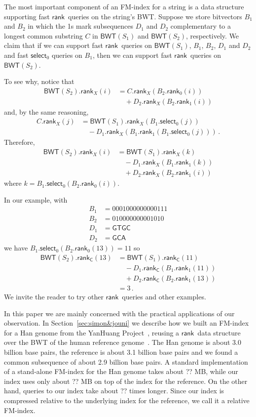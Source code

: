 \documentclass{llncs}
\newcommand{\BWT}
  {\ensuremath{\mathsf{BWT}}}
\newcommand{\rank}
  {\ensuremath{\mathsf{rank}}}
\newcommand{\select}
  {\ensuremath{\mathsf{select}}}
\begin{document}
The most important component of an FM-index for a string is a data structure supporting fast \rank\ queries on the string's BWT.  Suppose we store bitvectors $B_1$ and $B_2$ in which the 1s mark subsequences $D_1$ and $D_2$ complementary to a longest common substring $C$ in \(\BWT (S_1)\) and \(\BWT (S_2)\), respectively.  We claim that if we can support fast \rank\ queries on \(\BWT (S_1)\), $B_1$, $B_2$, $D_1$ and $D_2$ and fast $\select_0$ queries on $B_1$, then we can support fast \rank\ queries on \(\BWT (S_2)\).

To see why, notice that
\begin{align*}
\BWT (S_2).\rank_X (i)
& = C.\rank_X (B_2.\rank_0 (i))\\
& \quad + D_2.\rank_X (B_2.\rank_1 (i))
\end{align*}
and, by the same reasoning, 
\begin{align*}
C.\rank_X (j)
& = \BWT (S_1).\rank_X (B_1.\select_0 (j))\\
& \quad - D_1.\rank_X (B_1.\rank_1 (B_1.\select_0 (j)))\,.
\end{align*}
Therefore,
\begin{align*}
\BWT (S_2).\rank_X (i)
& = \BWT (S_1).\rank_X (k)\\
& \quad - D_1.\rank_X (B_1.\rank_1 (k))\\
& \quad + D_2.\rank_X (B_2.\rank_1 (i))
\end{align*}
where \(k = B_1.\select_0 (B_2.\rank_0 (i))\).

In our example, with
\begin{align*}
B_1 & = 0001000000000111\\
B_2 & = 010000000001010\\
D_1 & = \mathsf{GTGC}\\
D_2 & = \mathsf{GCA}
\end{align*}
we have \(B_1.\select_0 (B_2.\rank_0 (13)) = 11\) so
\begin{align*}
\BWT (S_2).\rank_\mathsf{C} (13)
& = \BWT (S_1).\rank_\mathsf{C} (11)\\
& \quad - D_1.\rank_\mathsf{C} (B_1.\rank_1 (11))\\
& \quad + D_2.\rank_\mathsf{C} (B_2.\rank_1 (13))\\
& = 3\,.
\end{align*}
We invite the reader to try other \rank\ queries and other examples.

In this paper we are mainly concerned with the practical applications of our observation.  In Section~\ref{sec:simon&jouni} we describe how we built an FM-index for a Han genome from the YanHuang Project~\cite{??}, reusing a \rank\ data structure over the BWT of the human reference genome~\cite{??}.  The Han genome is about 3.0 billion  base pairs, the reference is about 3.1 billion base pairs and we found a common subsequence of about 2.9 billion base pairs.  A standard implementation~\cite{??} of a stand-alone FM-index for the Han genome takes about ?? MB, while our index uses only about ?? MB on top of the index for the reference.  On the other hand, queries to our index take about ?? times longer.  Since our index is compressed relative to the underlying index for the reference, we call it a relative FM-index.
\end{document}
